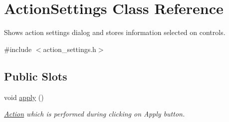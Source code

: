 \hypertarget{class_action_settings}{\section{Action\-Settings Class Reference}
\label{class_action_settings}
}


Shows action settings dialog and stores information selected on controls.  




{\ttfamily \#include $<$action\-\_\-settings.\-h$>$}

\subsection*{Public Slots}
\begin{DoxyCompactItemize}
\item 
void \hyperlink{class_action_settings_ab981f3119789573325f185abfda7f016}{apply} ()
\begin{DoxyCompactList}\small\item\em \hyperlink{class_action}{Action} which is performed during clicking on Apply button. \end{DoxyCompactList}\end{DoxyCompactItemize}
